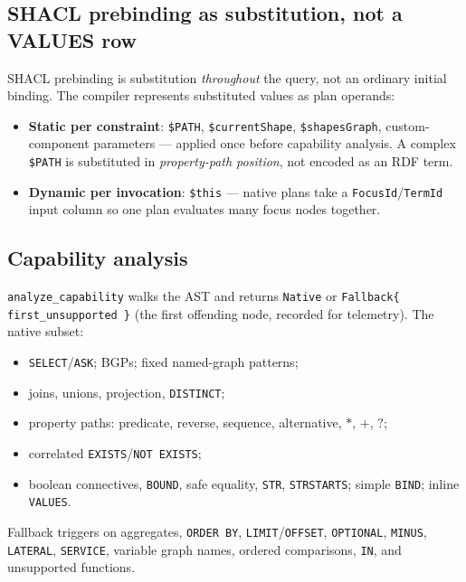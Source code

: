 \documentclass[11pt]{article}
\newcommand{\code}[1]{\texttt{#1}}
\theoremstyle{definition}
\begin{document}
\subsection{SHACL prebinding as substitution, not a VALUES row}
SHACL prebinding is substitution \emph{throughout} the query, not an ordinary
initial binding. The compiler represents substituted values as plan operands:
\begin{itemize}[leftmargin=1.4em]
  \item \textbf{Static per constraint}: \code{\$PATH}, \code{\$currentShape},
  \code{\$shapesGraph}, custom-component parameters --- applied once before
  capability analysis. A complex \code{\$PATH} is substituted in
  \emph{property-path position}, not encoded as an RDF term.
  \item \textbf{Dynamic per invocation}: \code{\$this} --- native plans take a
  \code{FocusId}/\code{TermId} input column so one plan evaluates many focus nodes
  together.
\end{itemize}

\subsection{Capability analysis}
\code{analyze\_capability} walks the AST and returns \code{Native} or
\code{Fallback\{ first\_unsupported \}} (the first offending node, recorded for
telemetry). The native subset:
\begin{itemize}[leftmargin=1.4em]
  \item \code{SELECT}/\code{ASK}; BGPs; fixed named-graph patterns;
  \item joins, unions, projection, \code{DISTINCT};
  \item property paths: predicate, reverse, sequence, alternative, $*$, $+$, $?$;
  \item correlated \code{EXISTS}/\code{NOT EXISTS};
  \item boolean connectives, \code{BOUND}, safe equality, \code{STR},
  \code{STRSTARTS}; simple \code{BIND}; inline \code{VALUES}.
\end{itemize}
Fallback triggers on aggregates, \code{ORDER BY}, \code{LIMIT}/\code{OFFSET},
\code{OPTIONAL}, \code{MINUS}, \code{LATERAL}, \code{SERVICE}, variable graph
names, ordered comparisons, \code{IN}, and unsupported functions.
\end{document}
